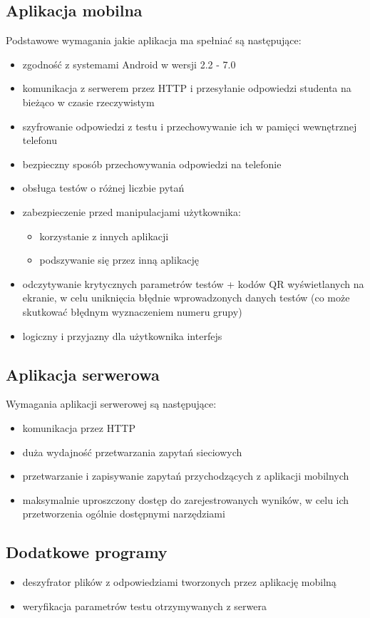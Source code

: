 \documentclass[eng]{mgr}
\begin{document}
			\subsection{Aplikacja mobilna}
			Podstawowe wymagania jakie aplikacja ma spełniać są następujące:
			\begin{itemize}
				\item zgodność z systemami Android w wersji 2.2 - 7.0
				\item komunikacja z serwerem przez HTTP i przesyłanie odpowiedzi studenta na bieżąco w czasie rzeczywistym
				\item szyfrowanie odpowiedzi z testu i przechowywanie ich w pamięci wewnętrznej telefonu
				\item bezpieczny sposób przechowywania odpowiedzi na telefonie
				\item obsługa testów o różnej liczbie pytań
				\item zabezpieczenie przed manipulacjami użytkownika:
				\begin{itemize}
					\item korzystanie z innych aplikacji
					\item podszywanie się przez inną aplikację
				\end{itemize} 
				\item odczytywanie krytycznych parametrów testów + kodów QR wyświetlanych na ekranie, w celu uniknięcia błędnie wprowadzonych danych testów (co może skutkować błędnym wyznaczeniem numeru grupy)
				\item logiczny i przyjazny dla użytkownika interfejs
			\end{itemize}
		
			\subsection{Aplikacja serwerowa}
			Wymagania aplikacji serwerowej są następujące:
			\begin{itemize}
				\item komunikacja przez HTTP
				\item duża wydajność przetwarzania zapytań sieciowych
				\item przetwarzanie i zapisywanie zapytań przychodzących z aplikacji mobilnych
				\item maksymalnie uproszczony dostęp do zarejestrowanych wyników, w celu ich przetworzenia ogólnie dostępnymi narzędziami
			\end{itemize}
		
			\subsection{Dodatkowe programy}
			\begin{itemize}
				\item deszyfrator plików z odpowiedziami tworzonych przez aplikację mobilną
				\item weryfikacja parametrów testu otrzymywanych z serwera
			\end{itemize}
		
\end{document}

